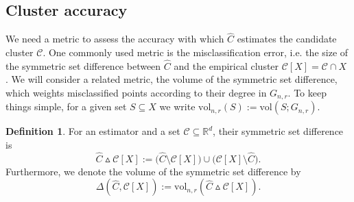 \documentclass[11pt,twoside]{article}
\theoremstyle{definition}
\newtheorem{definition}{Definition}
\newcommand{\Reals}{\mathbb{R}}
\newcommand{\1}{\mathbf{1}}
\newcommand{\Rd}{\Reals^d}
\newcommand{\mc}[1]{\mathcal{#1}}
\newcommand{\wh}[1]{\widehat{#1}}
\newcommand{\vol}{\mathrm{vol}}
\begin{document}
\subsection{Cluster accuracy}
We need a metric to assess the accuracy with which $\wh{C}$ estimates the candidate cluster $\mc{C}$. One commonly used metric is the misclassification error, i.e. the size of the symmetric set difference
between $\wh{C}$ and the empirical cluster $\mc{C}[X] = \mc{C} \cap X$ \citep{korostelev1993,polonik1995,rigollet2009}. We
will consider a related metric, the volume of the symmetric set difference,
which weights misclassified points according to their degree in $G_{n,r}$. To keep things simple, for a given set $S \subseteq X$ we write $\vol_{n,r}(S) := \vol(S;G_{n,r})$. 
\begin{definition}
	\label{def:volume_symmetric_set_difference}
	For an estimator \smash{$\wh{C} \subseteq X$} and a set 
	$\mathcal{C} \subseteq \Rd$, their symmetric set difference is 
	\begin{equation*}
	\wh{C} \vartriangle \mathcal{C}[X] :=
	\bigl(\wh{C} \setminus \mathcal{C}[X]\bigr) \cup
	\bigl(\mathcal{C}[X] \setminus \wh{C}\bigr).
	\end{equation*}
	Furthermore, we denote the volume of the symmetric set difference by 
	$$
	\Delta(\wh{C}, \mathcal{C}[X]) := \vol_{n,r}(\wh{C} \vartriangle \mathcal{C}[X]). 
	$$
\end{definition}
\end{document}
